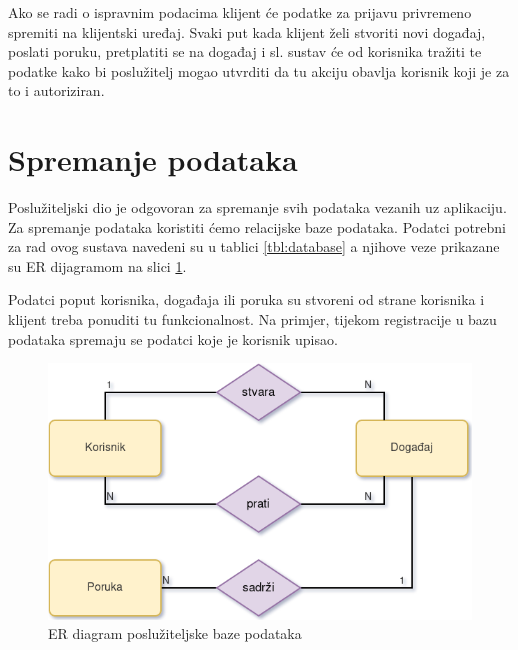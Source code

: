 \documentclass[times, utf8, zavrsni]{fer}
\begin{document}
{Ako se radi o ispravnim podacima klijent će podatke za prijavu privremeno spremiti na klijentski uređaj. Svaki put kada klijent želi stvoriti novi događaj, poslati poruku, pretplatiti se na događaj i sl. sustav će od korisnika tražiti te podatke kako bi poslužitelj mogao utvrditi da tu akciju obavlja korisnik koji je za to i autoriziran.

\section{Spremanje podataka}
Poslužiteljski dio je odgovoran za spremanje svih podataka vezanih uz aplikaciju. Za spremanje podataka koristiti ćemo relacijske baze podataka. Podatci potrebni za rad ovog sustava navedeni su u tablici \ref{tbl:database} a njihove veze prikazane su ER dijagramom na slici \ref{fig:er-model-image}.

Podatci poput korisnika, događaja ili poruka su stvoreni od strane korisnika i klijent treba ponuditi tu funkcionalnost. Na primjer, tijekom registracije u bazu podataka spremaju se podatci koje je korisnik upisao.

\begin{figure}[htb]
\centering
\includegraphics[width=12cm]{img/er.png}
\caption{ER diagram poslužiteljske baze podataka}
\label{fig:er-model-image}
\end{figure}

}
\end{document}
